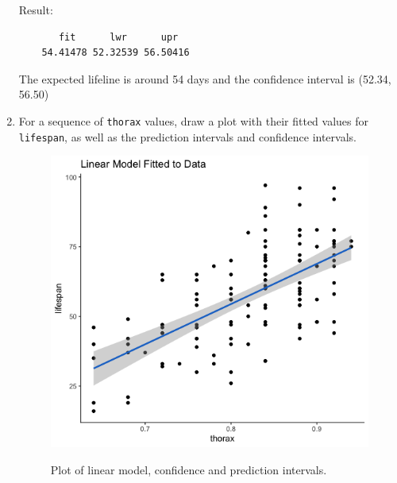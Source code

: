\documentclass[12pt,letterpaper]{article}
\begin{document}
\begin{enumerate}
	
		Result:
	\begin{Verbatim}
       fit      lwr      upr
    54.41478 52.32539 56.50416
	\end{Verbatim}
	
	The expected lifeline is around 54 days and the confidence interval is (52.34, 56.50)
	\vspace{.5cm}
			
	\item	For a sequence of \texttt{thorax} values, draw a plot with their fitted values for \texttt{lifespan}, as well as the prediction intervals and confidence intervals.
	
	\begin{figure}[h!]\centering
	\caption{\footnotesize Plot of linear model, confidence and prediction intervals.
	}\vspace{-1cm}
	\label{figure2}
	\includegraphics[width=.85\textwidth]{Q7.png}\\
	\end{figure}
	
	

\end{enumerate}
\end{document}
